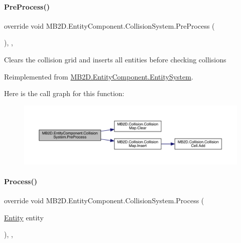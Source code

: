 \paragraph{\texorpdfstring{Pre\+Process()}{PreProcess()}}
{\footnotesize\ttfamily override void M\+B2\+D.\+Entity\+Component.\+Collision\+System.\+Pre\+Process (\begin{DoxyParamCaption}{ }\end{DoxyParamCaption})\hspace{0.3cm}{\ttfamily [inline]}, {\ttfamily [protected]}, {\ttfamily [virtual]}}



Clears the collision grid and inserts all entities before checking collisions 



Reimplemented from \hyperlink{class_m_b2_d_1_1_entity_component_1_1_entity_system_aadc002dd04d9cb75775ca955a28e303e}{M\+B2\+D.\+Entity\+Component.\+Entity\+System}.

Here is the call graph for this function\+:
\nopagebreak
\begin{figure}[H]
\begin{center}
\leavevmode
\includegraphics[width=350pt]{class_m_b2_d_1_1_entity_component_1_1_collision_system_ad591227767c8b6c66ca3891de04e9050_cgraph}
\end{center}
\end{figure}
\hypertarget{class_m_b2_d_1_1_entity_component_1_1_collision_system_adfbee070ed7b120565a5f8a08c159535}{}\label{class_m_b2_d_1_1_entity_component_1_1_collision_system_adfbee070ed7b120565a5f8a08c159535} 
\paragraph{\texorpdfstring{Process()}{Process()}}
{\footnotesize\ttfamily override void M\+B2\+D.\+Entity\+Component.\+Collision\+System.\+Process (\begin{DoxyParamCaption}\item[{\hyperlink{class_m_b2_d_1_1_entity_component_1_1_entity}{Entity}}]{entity }\end{DoxyParamCaption})\hspace{0.3cm}{\ttfamily [inline]}, {\ttfamily [protected]}, {\ttfamily [virtual]}}



